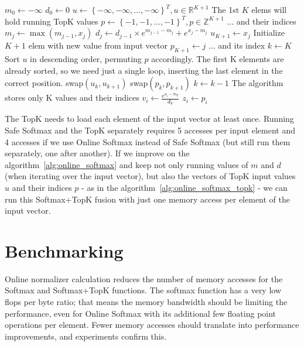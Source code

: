 \begin{algorithm}[ht]
\caption{Online softmax and top-k}
\label{alg:online_softmax_topk}
\begin{algorithmic}[1]
\State $m_0\gets -\infty$
\State $d_0\gets 0$
\State $u\gets \left\{-\infty,-\infty,\dots,-\infty\right\}^T, u\in\mathbb{R}^{K+1}$ \Comment The 1st $K$ elems will hold running TopK values \State $p\gets \left\{-1,-1,\dots,-1\right\}^T, p\in \mathbb{Z}^{K+1}$ \Comment ... and their indices
\State $m_j\gets \max\left(m_{j-1},x_j\right)$
\State $d_j\gets d_{j-1}\times e^{m_{j-1}-m_j} +e^{x_j-m_j}$
\State $u_{K+1}\gets x_j$ \Comment Initialize $K+1$ elem with new value from input vector \State $p_{K+1}\gets j$ \Comment ... and its index \State $k\gets K$\label{alg:start_partial_topk_lines} \Comment Sort $u$ in descending order, permuting $p$ accordingly. The first K elements are already sorted, so we need just a single loop, inserting the last element in the correct position.
	\State swap$\left(u_k,u_{k+1}\right)$
    \State swap$\left(p_k,p_{k+1}\right)$
    \State $k\gets k-1$
\EndWhile\label{alg:end_partial_topk_lines}
\EndFor
{} \Comment The algorithm stores only K values and their indices \State $v_i\gets \frac{e^{u_i-m_V}}{d_V}$
\State $z_i\gets p_i$
\EndFor
\end{algorithmic}
\end{algorithm}

The TopK needs to load each element of the input vector at least once. Running Safe Softmax and the TopK separately requires 5 accesses per input element and 4 accesses if we use Online Softmax instead of Safe Softmax (but still run them separately, one after another). If we improve on the algorithm~\ref{alg:online_softmax} and keep not only running values of $m$ and $d$ (when iterating over the input vector), but also the vectors of TopK input values $u$ and their indices $p$ - as in the algorithm~\ref{alg:online_softmax_topk} - we can run this Softmax+TopK fusion with just one memory access per element of the input vector.

\section{Benchmarking}
Online normalizer calculation reduces the number of memory accesses for the Softmax and Softmax+TopK functions. The softmax function has a very low flops per byte ratio; that means the memory bandwidth should be limiting the performance, even for Online Softmax with its additional few floating point operations per element. Fewer memory accesses should translate into performance improvements, and experiments confirm this.

